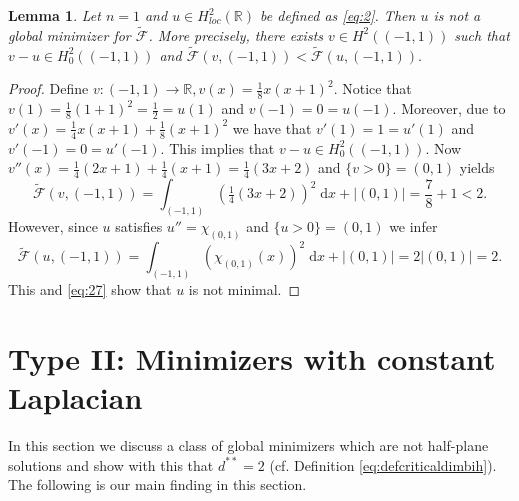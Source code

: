 \documentclass[twoside,11pt]{article}
\newtheorem{lemma}{Lemma}
\theoremstyle{definition}
\begin{document}
\begin{lemma}\label{lem:onesided}
    Let $n = 1$ and  $u \in H^2_{loc}(\mathbb{R})$ be defined as \eqref{eq:2}. Then $u$ is not a global minimizer for $\tilde{\mathcal{F}}$. More precisely, there exists $v \in H^2((-1,1))$ such that $v-u \in H_0^2((-1,1))$ and $\tilde{\mathcal{F}}(v, (-1,1)) < \mathcal{\tilde{F}}(u,(-1,1)).$
\end{lemma}
\begin{proof}
    Define $v: (-1,1) \rightarrow \mathbb{R}, v(x)= \frac{1}{8}x (x+1)^2$. Notice that $v(1) = \frac{1}{8}(1+1)^2= \frac{1}{2} = u(1)$ and $v(-1)=0 = u(-1)$. Moreover, due to 
  $
        v'(x) = \frac{1}{4} x(x+1) + \frac{1}{8}(x+1)^2
   $
    we have that $v'(1)= 1 = u'(1)$ and $v'(-1) =0 = u'(-1)$. This implies that $v-u \in H_0^2((-1,1))$. Now  $v''(x) = \frac{1}{4} (2x+1) + \frac{1}{4} (x+1) = \frac{1}{4} (3x+2)$ and $\{v > 0 \} = (0,1)$ yields
    \begin{equation}\label{eq:27}
        \tilde{\mathcal{F}}(v,(-1,1))  = \int_{(-1,1)} \left(\tfrac{1}{4}(3x+2)\right)^2 \; \mathrm{d}x + |(0,1)| = \frac{7}{8} + 1 < 2. 
    \end{equation}
    However, since $u$ satisfies $u'' =  \chi_{(0,1)}$ and $ \{ u > 0 \} = (0,1)$ we infer
    \begin{equation*}
        \tilde{\mathcal{F}}(u,(-1,1))  = \int_{(-1,1)} (\chi_{(0,1)}(x))^2 \; \mathrm{d}x + |(0,1)| = 2 |(0,1)| = 2. 
    \end{equation*}
    This and \eqref{eq:27} show that $u$ is not  minimal. 
\end{proof}



\section{Type II: Minimizers with constant Laplacian}\label{sec:constLaplacian}

In this section we discuss
a class of global minimizers which are not half-plane solutions and show with this that $d^{**} = 2$ (cf. Definition \ref{eq:defcriticaldimbih}). The following is our main finding in this section.
\end{document}
